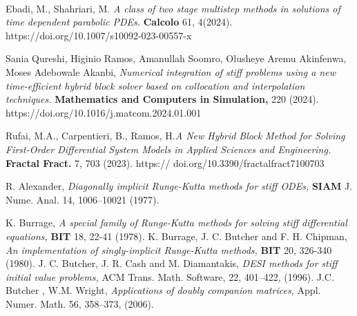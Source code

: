 ‎\documentclass[a4paper,10pt]{article}‎
\begin{document}
\begin{thebibliography}{}
Ebadi, M., Shahriari, M. \emph{A class of two stage multistep methods in solutions of time dependent parabolic PDEs.} \textbf{Calcolo} 61, 4(2024).  https://doi.org/10.1007/s10092-023-00557-x

Sania Qureshi, Higinio Ramos, Amanullah Soomro, Olusheye Aremu Akinfenwa, Moses Adebowale Akanbi, \emph{Numerical integration of stiff problems using a new time-efficient hybrid block solver based on collocation and interpolation techniques.} \textbf{Mathematics and Computers in Simulation,} 220 (2024).  https://doi.org/10.1016/j.matcom.2024.01.001

Rufai, M.A., Carpentieri, B.,  Ramos, H.\emph{A New Hybrid Block Method for Solving First-Order
Differential System Models in Applied Sciences and Engineering.} \textbf{Fractal Fract. } 7, 703 (2023).  https://
doi.org/10.3390/fractalfract7100703

  R. Alexander, \emph{Diagonally implicit Runge-Kutta methods for stiff ODEs,} \textbf{SIAM} J. Nume. Anal. 14, 1006--10021 (1977).

  K. Burrage, \emph{A special family of Runge-Kutta methods for solving stiff differential equations,} \textbf{BIT} 18, 22-41 (1978).
  K. Burrage, J. C. Butcher and F. H. Chipman, \emph{An implementation of  singly-implicit Runge-Kutta methods,} \textbf{BIT} 20, 326-340 (1980).
   J. C. Butcher, J. R. Cash and M. Diamantakis, \emph{DESI  methods  for stiff initial value problems,} ACM Trans. Math. Software, 22, 401--422, (1996).
  J.C. Butcher , W.M. Wright, \emph{Applications of doubly companion matrices,} Appl. Numer. Math. 56, 358--373, (2006).


\end{thebibliography}
\end{document}
